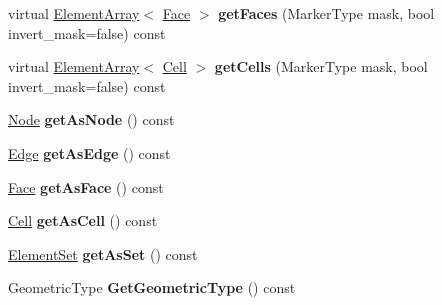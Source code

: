 \begin{DoxyCompactItemize}
\item 
\hypertarget{classINMOST_1_1Element_a42406f6dc1134c7daea98606c1225486}{virtual \hyperlink{classINMOST_1_1ElementArray}{Element\-Array}$<$ \hyperlink{classINMOST_1_1Face}{Face} $>$ {\bfseries get\-Faces} (Marker\-Type mask, bool invert\-\_\-mask=false) const }\label{classINMOST_1_1Element_a42406f6dc1134c7daea98606c1225486}

\item 
\hypertarget{classINMOST_1_1Element_aae8ce8b88935469fea8c4880282710a5}{virtual \hyperlink{classINMOST_1_1ElementArray}{Element\-Array}$<$ \hyperlink{classINMOST_1_1Cell}{Cell} $>$ {\bfseries get\-Cells} (Marker\-Type mask, bool invert\-\_\-mask=false) const }\label{classINMOST_1_1Element_aae8ce8b88935469fea8c4880282710a5}

\item 
\hypertarget{classINMOST_1_1Element_a9f15878b1862036517718dee27030da5}{\hyperlink{classINMOST_1_1Node}{Node} {\bfseries get\-As\-Node} () const }\label{classINMOST_1_1Element_a9f15878b1862036517718dee27030da5}

\item 
\hypertarget{classINMOST_1_1Element_a8df59b1588049676515d087a70466f3b}{\hyperlink{classINMOST_1_1Edge}{Edge} {\bfseries get\-As\-Edge} () const }\label{classINMOST_1_1Element_a8df59b1588049676515d087a70466f3b}

\item 
\hypertarget{classINMOST_1_1Element_aa8d708231a3b1da2f9006343be372bfe}{\hyperlink{classINMOST_1_1Face}{Face} {\bfseries get\-As\-Face} () const }\label{classINMOST_1_1Element_aa8d708231a3b1da2f9006343be372bfe}

\item 
\hypertarget{classINMOST_1_1Element_ae4c3af5bec31c6c9602132f6f8738265}{\hyperlink{classINMOST_1_1Cell}{Cell} {\bfseries get\-As\-Cell} () const }\label{classINMOST_1_1Element_ae4c3af5bec31c6c9602132f6f8738265}

\item 
\hypertarget{classINMOST_1_1Element_aba796c6420e3a223153683f8dd755338}{\hyperlink{classINMOST_1_1ElementSet}{Element\-Set} {\bfseries get\-As\-Set} () const }\label{classINMOST_1_1Element_aba796c6420e3a223153683f8dd755338}

\item 
\hypertarget{classINMOST_1_1Element_a26cd9c99f7dc558190a8fb4b30074d54}{Geometric\-Type {\bfseries Get\-Geometric\-Type} () const }\label{classINMOST_1_1Element_a26cd9c99f7dc558190a8fb4b30074d54}


\end{DoxyCompactItemize}
